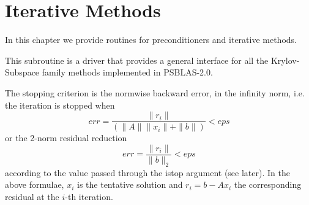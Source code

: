 \section{Iterative Methods}
\label{sec:methods}

In this chapter we provide routines for preconditioners and iterative
methods. 

%
%


This subroutine is a driver that provides a general interface for all
the Krylov-Subspace family methods implemented in PSBLAS-2.0. 

The stopping criterion is the normwise backward error, in the infinity
norm, i.e. the iteration is stopped when 
\[ err = \frac{\|r_i\|}{(\|A\|\|x_i\|+\|b\|)} < eps \]
or the 2-norm residual reduction
\[ err = \frac{\|r_i\|}{\|b\|_2} < eps \]
according to the value passed through the  istop argument (see
later). In the above formulae, $x_i$ is the tentative solution and
$r_i=b-Ax_i$ the corresponding residual at the $i$-th iteration. 



